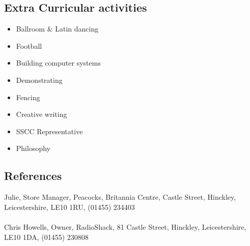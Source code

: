 \documentclass[0pt]{article}
\begin{document}
\subsection*{Extra Curricular activities}
\begin{itemize}
	\item Ballroom \& Latin dancing
	\item Football
	\item Building computer systems
	\item Demonstrating
	\item Fencing
	\item Creative writing
	\item SSCC Representative 
	\item Philosophy 
\end{itemize}

\subsection*{References}
Julie, Store Manager, Peacocks, Britannia Centre, Castle Street, Hinckley, Leicestershire, LE10 1RU, 
(01455) 234403
\\\\
Chris Howells, Owner, RadioShack, 81 Castle Street, Hinckley, Leicestershire, LE10 1DA,
(01455) 230808 
\end{document}
